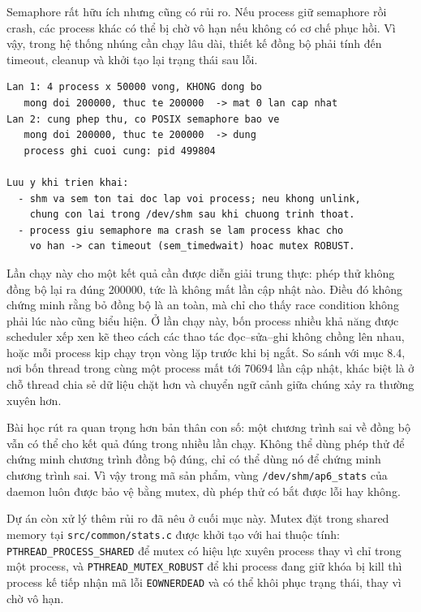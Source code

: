 \documentclass[11pt]{article}
\newcommand{\code}[1]{\texttt{#1}}
\begin{document}
Semaphore rất hữu ích nhưng cũng có rủi ro. Nếu process giữ semaphore rồi crash, các process khác có thể bị chờ vô hạn nếu không có cơ chế phục hồi. Vì vậy, trong hệ thống nhúng cần chạy lâu dài, thiết kế đồng bộ phải tính đến timeout, cleanup và khởi tạo lại trạng thái sau lỗi.

\begin{lstlisting}[caption={Shared memory với và không có semaphore}]
Lan 1: 4 process x 50000 vong, KHONG dong bo
   mong doi 200000, thuc te 200000  -> mat 0 lan cap nhat
Lan 2: cung phep thu, co POSIX semaphore bao ve
   mong doi 200000, thuc te 200000  -> dung
   process ghi cuoi cung: pid 499804

Luu y khi trien khai:
  - shm va sem ton tai doc lap voi process; neu khong unlink,
    chung con lai trong /dev/shm sau khi chuong trinh thoat.
  - process giu semaphore ma crash se lam process khac cho
    vo han -> can timeout (sem_timedwait) hoac mutex ROBUST.
\end{lstlisting}

Lần chạy này cho một kết quả cần được diễn giải trung thực: phép thử không đồng bộ lại ra đúng 200000, tức là không mất lần cập nhật nào. Điều đó không chứng minh rằng bỏ đồng bộ là an toàn, mà chỉ cho thấy race condition không phải lúc nào cũng biểu hiện. Ở lần chạy này, bốn process nhiều khả năng được scheduler xếp xen kẽ theo cách các thao tác đọc--sửa--ghi không chồng lên nhau, hoặc mỗi process kịp chạy trọn vòng lặp trước khi bị ngắt. So sánh với mục 8.4, nơi bốn thread trong cùng một process mất tới 70694 lần cập nhật, khác biệt là ở chỗ thread chia sẻ dữ liệu chặt hơn và chuyển ngữ cảnh giữa chúng xảy ra thường xuyên hơn.

Bài học rút ra quan trọng hơn bản thân con số: một chương trình sai về đồng bộ vẫn có thể cho kết quả đúng trong nhiều lần chạy. Không thể dùng phép thử để chứng minh chương trình đồng bộ đúng, chỉ có thể dùng nó để chứng minh chương trình sai. Vì vậy trong mã sản phẩm, vùng \code{/dev/shm/ap6\_stats} của daemon luôn được bảo vệ bằng mutex, dù phép thử có bắt được lỗi hay không.

Dự án còn xử lý thêm rủi ro đã nêu ở cuối mục này. Mutex đặt trong shared memory tại \code{src/common/stats.c} được khởi tạo với hai thuộc tính: \code{PTHREAD\_PROCESS\_SHARED} để mutex có hiệu lực xuyên process thay vì chỉ trong một process, và \code{PTHREAD\_MUTEX\_ROBUST} để khi process đang giữ khóa bị kill thì process kế tiếp nhận mã lỗi \code{EOWNERDEAD} và có thể khôi phục trạng thái, thay vì chờ vô hạn.
\end{document}

